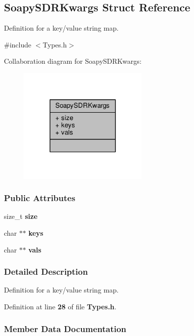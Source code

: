 \subsection{Soapy\+S\+D\+R\+Kwargs Struct Reference}
\label{structSoapySDRKwargs}


Definition for a key/value string map.  




{\ttfamily \#include $<$Types.\+h$>$}



Collaboration diagram for Soapy\+S\+D\+R\+Kwargs\+:
\nopagebreak
\begin{figure}[H]
\begin{center}
\leavevmode
\includegraphics[width=179pt]{d1/dfa/structSoapySDRKwargs__coll__graph}
\end{center}
\end{figure}
\subsubsection*{Public Attributes}
\begin{DoxyCompactItemize}
\item 
size\+\_\+t {\bf size}
\item 
char $\ast$$\ast$ {\bf keys}
\item 
char $\ast$$\ast$ {\bf vals}
\end{DoxyCompactItemize}


\subsubsection{Detailed Description}
Definition for a key/value string map. 

Definition at line {\bf 28} of file {\bf Types.\+h}.



\subsubsection{Member Data Documentation}
